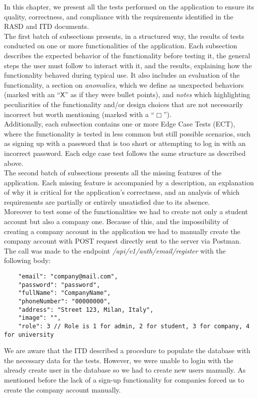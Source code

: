 % 
In this chapter, we present all the tests performed on the application to ensure its quality, correctness, and compliance with the requirements identified in the RASD and ITD documents.\\
The first batch of subsections presents, in a structured way, the results of tests conducted on one or more functionalities of the application. Each subsection describes the expected behavior of the functionality before testing it, the general steps the user must follow to interact with it, and the results, explaining how the functionality behaved during typical use. It also includes an evaluation of the functionality, a section on \textit{anomalies}, which we define as unexpected behaviors (marked with an “\(\mathsf{X}\)” as if they were bullet points), and \textit{notes} which highlighting peculiarities of the functionality and/or design choices that are not necessarily incorrect but worth mentioning (marked with a “\(\Box \)”).\\
Additionally, each subsection contains one or more Edge Case Tests (ECT), where the functionality is tested in less common but still possible scenarios, such as signing up with a password that is too short or attempting to log in with an incorrect password. Each edge case test follows the same structure as described above.\\
The second batch of subsections presents all the missing features of the application. Each missing feature is accompanied by a description, an explanation of why it is critical for the application's correctness, and an analysis of which requirements are partially or entirely unsatisfied due to its absence.
\\

\noindent Moreover to test some of the functionalities we had to create not only a student account but also a company one. Because of this, and the impossibility of creating a company account in the application we had to manually create the company account with POST request directly sent to the server via Postman. The call was made to the endpoint \textit{/api/v1/auth/email/register} with the following body:
\begin{verbatim}
    "email": "company@mail.com",
    "password": "password",
    "fullName": "CompanyName",
    "phoneNumber": "00000000",
    "address": "Street 123, Milan, Italy",
    "image": "",
    "role": 3 // Role is 1 for admin, 2 for student, 3 for company, 4 for university
\end{verbatim}
We are aware that the ITD described a procedure to populate the database with the necessary data for the tests. However, we were unable to login with the already create user in the database so we had to create new users manually. As mentioned before the lack of a sign-up functionality for companies forced us to create the company account manually.


